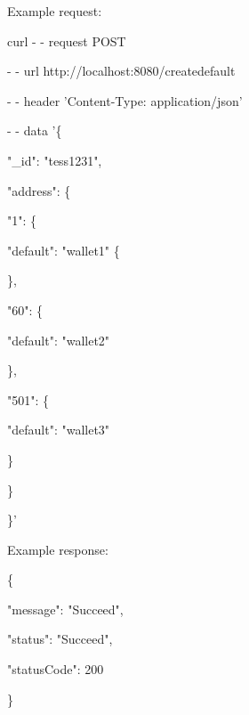 Example request:

\begin{framed}
\hspace*{13mm}    curl - - request POST \par
\hspace*{13mm}        - - url http://localhost:8080/createdefault \par
\hspace*{13mm}        - - header 'Content-Type: application/json' \par
\hspace*{13mm}        - - data '\{ \par
\hspace*{20mm}                "\_id": "tess1231",\par
\hspace*{27mm}                "address": \{ \par
\hspace*{35mm}                "1": \{ \par
\hspace*{40mm}                "default": "wallet1" \{ \par
\hspace*{40mm}                \}, \par
\hspace*{35mm}                "60": \{ \par
\hspace*{40mm}                "default": "wallet2" \par
\hspace*{40mm}                \}, \par
\hspace*{35mm}                "501": \{ \par
\hspace*{40mm}                "default": "wallet3" \par
\hspace*{40mm}                \} \par
\hspace*{27mm}              \} \par
\hspace*{20mm}            \}' \par
\end{framed}

Example response:

\begin{framed}
    \hspace*{13mm}        \{ \par
    \hspace*{13mm}                "message": "Succeed",    \par
    \hspace*{13mm}                "status": "Succeed",    \par
    \hspace*{13mm}             "statusCode": 200    \par
    \hspace*{13mm}                 \}    \par
\end{framed}



